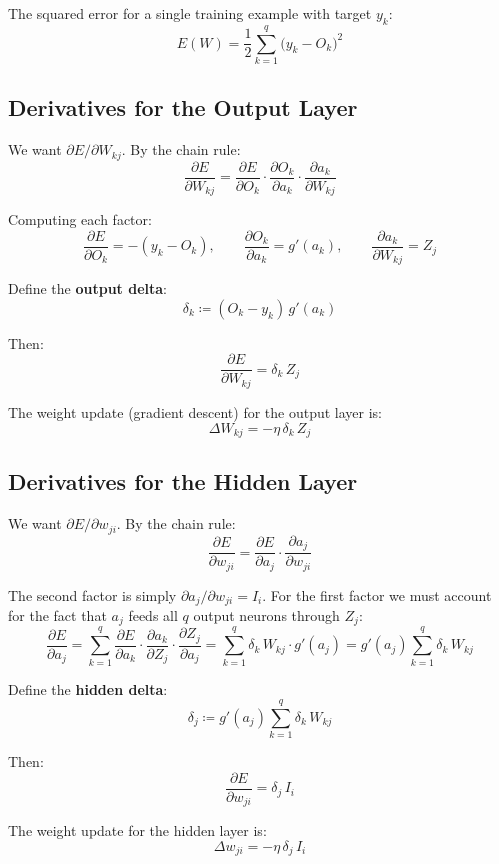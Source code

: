 \documentclass[11pt,a4paper]{article}
\theoremstyle{definition}
\theoremstyle{plain}
\theoremstyle{remark}
\begin{document}
The squared error for a single training example with target $y_k$:
\[
    E(W) = \frac{1}{2}\sum_{k=1}^{q} {\bigl(y_k - O_k\bigr)}^{2}
\]

\subsection{Derivatives for the Output Layer}

We want $\partial E / \partial W_{kj}$. By the chain rule:
\[
    \frac{\partial E}{\partial W_{kj}} = \frac{\partial E}{\partial O_k}\cdot\frac{\partial O_k}{\partial a_k}\cdot\frac{\partial a_k}{\partial W_{kj}}
\]

Computing each factor:
\[
    \frac{\partial E}{\partial O_k} = -(y_k - O_k), \qquad
    \frac{\partial O_k}{\partial a_k} = g'(a_k), \qquad
    \frac{\partial a_k}{\partial W_{kj}} = Z_j
\]

Define the \textbf{output delta}:
\[
    \delta_k \coloneqq (O_k - y_k)\,g'(a_k)
\]

Then:
\[
    \boxed{\frac{\partial E}{\partial W_{kj}} = \delta_k\,Z_j}
\]

The weight update (gradient descent) for the output layer is:
\[
    \Delta W_{kj} = -\eta\,\delta_k\,Z_j
\]

\subsection{Derivatives for the Hidden Layer}

We want $\partial E / \partial w_{ji}$. By the chain rule:
\[
    \frac{\partial E}{\partial w_{ji}} = \frac{\partial E}{\partial a_j}\cdot\frac{\partial a_j}{\partial w_{ji}}
\]

The second factor is simply $\partial a_j / \partial w_{ji} = I_i$. For the first factor we must account for the fact that $a_j$ feeds all $q$ output neurons through $Z_j$:
\[
    \frac{\partial E}{\partial a_j} = \sum_{k=1}^{q} \frac{\partial E}{\partial a_k}\cdot\frac{\partial a_k}{\partial Z_j}\cdot\frac{\partial Z_j}{\partial a_j}
    = \sum_{k=1}^{q} \delta_k\,W_{kj}\cdot g'(a_j)
    = g'(a_j)\sum_{k=1}^{q} \delta_k\,W_{kj}
\]

Define the \textbf{hidden delta}:
\[
    \delta_j \coloneqq g'(a_j)\sum_{k=1}^{q} \delta_k\,W_{kj}
\]

Then:
\[
    \boxed{\frac{\partial E}{\partial w_{ji}} = \delta_j\,I_i}
\]

The weight update for the hidden layer is:
\[
    \Delta w_{ji} = -\eta\,\delta_j\,I_i
\]
\end{document}
